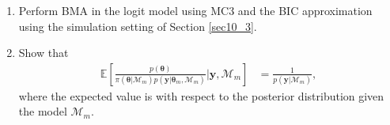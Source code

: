 \begin{enumerate}
\item Perform BMA in the logit model using MC3 and the BIC approximation using the simulation setting of Section \ref{sec10_3}.

\item Show that 
\begin{align*}
	\mathbb{E}\left[\frac{p(\bm{\theta})}{\pi(\bm{\theta}|\mathcal{M}_m)p(\bm{y}|\bm{\theta}_m,\mathcal{M}_m)}\biggr\rvert \bm{y},\mathcal{M}_m\right]&=\frac{1}{p(\bm{y}|\mathcal{M}_m)},
\end{align*}
where the expected value is with respect to the posterior distribution given the model $\mathcal{M}_m$.        
	
\end{enumerate}